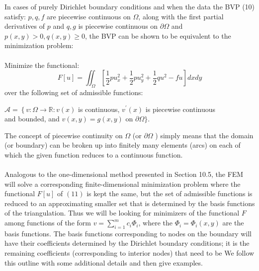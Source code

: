 \documentclass[../main.tex]{subfiles}
\begin{document}
In cases of purely Dirichlet boundary conditions and when the data the BVP (10) satisfy: $p, q, f$ are piecewise continuous on $\Omega$, along with the first partial
derivatives of $p$ and $q, g$ is piecewise continuous on $\partial \Omega$ and $p(x, y)>0, q(x, y) \geq 0$, the BVP can be shown to be equivalent to the minimization problem:
\\
\\
Minimize the functional:
\begin{equation}
F[u]=\iint_{\Omega}\left[\frac{1}{2} p u_{x}^{2}+\frac{1}{2} p u_{y}^{2}+\frac{1}{2} q u^{2}-f u\right] d x d y
\end{equation}
over the following set of admissible functions:
\begin{center}
$\mathcal{A}=\left\{v: \Omega \rightarrow \mathbb{R}: v(x)\right.$ is continuous, $v^{\prime}(x)$ is piecewise continuous
\\ and bounded, and $v(x, y)=g(x, y)$ on $\partial \Omega\}$.
\end{center}
The concept of piecewise continuity on $\Omega$ (or $\partial \Omega$ ) simply means that the domain (or boundary) can be broken up into finitely many elements (arcs) on each of which the given function reduces to a continuous function.
\\
\\
Analogous to the one-dimensional method presented in Section 10.5, the FEM will solve a corresponding finite-dimensional minimization problem where the functional $F[u]$ of $(11)$ is kept the same, but the set of admissible functions is reduced to an approximating smaller set that is determined by the basis functions of the triangulation. Thus we will be looking for minimizers of the functional $F$ among functions of the form $v=\sum_{i=1}^{m} c_{i} \Phi_{i}$, where the $\Phi_{i}=\Phi_{i}(x, y)$ are the basis functions. The basis functions corresponding to nodes on the boundary will have their coefficients determined by the Dirichlet boundary conditions; it is the remaining coefficients (corresponding to interior nodes) that need to be We follow this outline with some additional details and then give examples.
\end{document}
